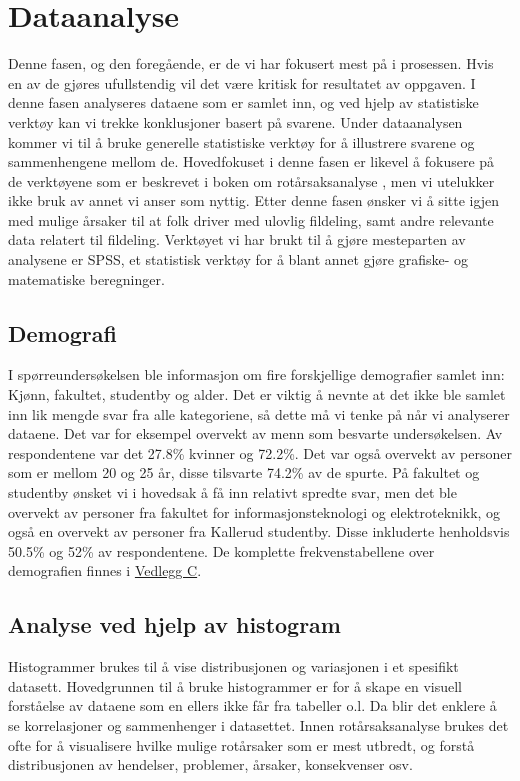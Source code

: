 \chapter{Dataanalyse}
Denne fasen, og den foregående, er de vi har fokusert mest på i prosessen. Hvis en av de gjøres ufullstendig vil det være kritisk for resultatet av oppgaven. I denne fasen analyseres dataene som er samlet inn, og ved hjelp av statistiske verktøy kan vi trekke konklusjoner basert på svarene. Under dataanalysen kommer vi til å bruke generelle statistiske verktøy for å illustrere svarene og sammenhengene mellom de. Hovedfokuset i denne fasen er likevel å fokusere på de verktøyene som er beskrevet i boken om rotårsaksanalyse \cite{RCA}, men vi utelukker ikke bruk av annet vi anser som nyttig. Etter denne fasen ønsker vi å sitte igjen med mulige årsaker til at folk driver med ulovlig fildeling, samt andre relevante data relatert til fildeling. Verktøyet vi har brukt til å gjøre mesteparten av analysene er SPSS, et statistisk verktøy for å blant annet gjøre grafiske- og matematiske beregninger.

\section{Demografi}
I spørreundersøkelsen ble informasjon om fire forskjellige demografier samlet inn: Kjønn, fakultet, studentby og alder. Det er viktig å nevnte at det ikke ble samlet inn lik mengde svar fra alle kategoriene, så dette må vi tenke på når vi analyserer dataene. Det var for eksempel overvekt av menn som besvarte undersøkelsen. Av respondentene var det 27.8\% kvinner og 72.2\%. Det var også overvekt av personer som er mellom 20 og 25 år, disse tilsvarte 74.2\% av de spurte. På fakultet og studentby ønsket vi i hovedsak å få inn relativt spredte svar, men det ble overvekt av personer fra fakultet for informasjonsteknologi og elektroteknikk, og også en overvekt av personer fra Kallerud studentby. Disse inkluderte henholdsvis 50.5\% og 52\% av respondentene. De komplette frekvenstabellene over demografien finnes i \hyperref[frekvens]{Vedlegg C}.

\section{Analyse ved hjelp av histogram}
Histogrammer brukes til å vise distribusjonen og variasjonen i et spesifikt datasett. Hovedgrunnen til å bruke histogrammer er for å skape en visuell forståelse av dataene som en ellers ikke får fra tabeller o.l. Da blir det enklere å se korrelasjoner og sammenhenger i datasettet. Innen rotårsaksanalyse brukes det ofte for å visualisere hvilke mulige rotårsaker som er mest utbredt, og forstå distribusjonen av hendelser, problemer, årsaker, konsekvenser osv. \cite{RCA}

